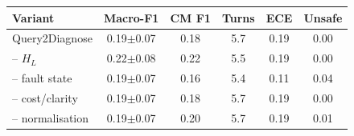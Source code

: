 \begin{tabular}{lccccc}
\toprule
Variant & Macro-F1 & CM F1 & Turns & ECE & Unsafe \\
\midrule
Query2Diagnose & 0.19$\pm$0.07 & 0.18 & 5.7 & 0.19 & 0.00 \\
-- $H_L$ & 0.22$\pm$0.08 & 0.22 & 5.5 & 0.19 & 0.00 \\
-- fault state & 0.19$\pm$0.07 & 0.16 & 5.4 & 0.11 & 0.04 \\
-- cost/clarity & 0.19$\pm$0.07 & 0.18 & 5.7 & 0.19 & 0.00 \\
-- normalisation & 0.19$\pm$0.07 & 0.20 & 5.7 & 0.19 & 0.01 \\
\bottomrule
\end{tabular}
